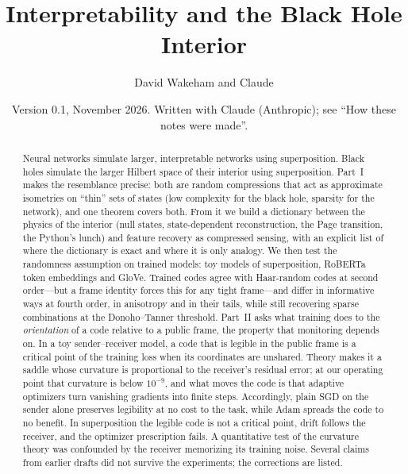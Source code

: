 \documentclass[11pt]{amsart}
\title[Interpretability and the black hole interior]{Interpretability and the Black Hole Interior}
\author{David Wakeham and Claude}
\date{Version 0.1, November 2026. Written with Claude (Anthropic); see ``How these notes were made''.}
\theoremstyle{plain}
\theoremstyle{definition}
\theoremstyle{remark}
\begin{document}
\begin{abstract}
Neural networks simulate larger, interpretable networks using superposition. Black holes simulate the larger
Hilbert space of their interior using superposition. Part~I makes the resemblance precise: both are random
compressions that act as approximate isometries on ``thin'' sets of states (low complexity for the black hole,
sparsity for the network), and one theorem covers both. From it we build a dictionary between the physics of the
interior (null states, state-dependent reconstruction, the Page transition, the Python's lunch) and feature
recovery as compressed sensing, with an explicit list of where the dictionary is exact and where it is only
analogy. We then test the randomness assumption on trained models: toy models of superposition, RoBERTa token
embeddings and GloVe. Trained codes agree with Haar-random codes at second order---but a frame identity forces
this for any tight frame---and differ in informative ways at fourth order, in anisotropy and in their tails, while
still recovering sparse combinations at the Donoho--Tanner threshold. Part~II asks what training does to the
\emph{orientation} of a code relative to a public frame, the property that monitoring depends on. In a toy
sender--receiver model, a code that is legible in the public frame is a critical point of the training loss when its
coordinates are unshared. Theory makes it a saddle whose curvature is proportional to the receiver's residual error;
at our operating point that curvature is below $10^{-9}$, and what moves the code is that adaptive optimizers turn
vanishing gradients into finite steps. Accordingly, plain SGD on the sender alone preserves legibility at no cost to
the task, while Adam spreads the code to no benefit. In superposition the legible code is not a critical point,
drift follows the receiver, and the optimizer prescription fails. A quantitative test of the curvature theory was
confounded by the receiver memorizing its training noise. Several claims from earlier drafts did not survive the experiments; the corrections are listed.
\end{abstract}

\maketitle
\end{document}
